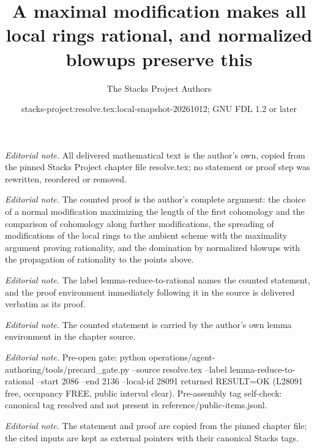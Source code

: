 \documentclass[10pt,a4paper]{amsart}
\title{A maximal modification makes all local rings rational, and normalized blowups preserve this}
\author{The Stacks Project Authors}
\date{stacks-project:resolve.tex:local-snapshot-20261012; GNU FDL 1.2 or later}
\theoremstyle{plain}
\theoremstyle{definition}
\theoremstyle{remark}
\numberwithin{equation}{subsection}
\begin{document}
\maketitle
\noindent\textit{Editorial note.} All delivered mathematical text is the author's own, copied from the pinned Stacks Project chapter file resolve.tex; no statement or proof step was rewritten, reordered or removed.\par\medskip
\noindent\textit{Editorial note.} The counted proof is the author's complete argument: the choice of a normal modification maximizing the length of the first cohomology and the comparison of cohomology along further modifications, the spreading of modifications of the local rings to the ambient scheme with the maximality argument proving rationality, and the domination by normalized blowups with the propagation of rationality to the points above.\par\medskip
\noindent\textit{Editorial note.} The label lemma-reduce-to-rational names the counted statement, and the proof environment immediately following it in the source is delivered verbatim as its proof.\par\medskip
\noindent\textit{Editorial note.} The counted statement is carried by the author's own lemma environment in the chapter source.\par\medskip
\noindent\textit{Editorial note.} Pre-open gate: python operations/agent-authoring/tools/precard\_gate.py --source resolve.tex --label lemma-reduce-to-rational --start 2086 --end 2136 --local-id 28091 returned RESULT=OK (L28091 free, occupancy FREE, public interval clear). Pre-assembly tag self-check: canonical tag resolved and not present in reference/public-items.jsonl.\par\medskip
\noindent\textit{Editorial note.} The statement and proof are copied from the pinned chapter file; the cited inputs are kept as external pointers with their canonical Stacks tags.\par\medskip
\end{document}
